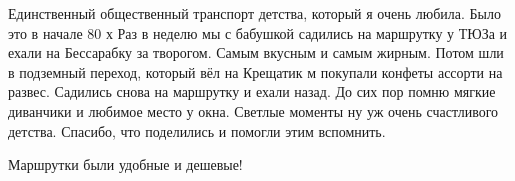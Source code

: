 \begin{itemize}
Единственный общественный транспорт детства, который я очень любила. Было это в
начале 80 х Раз в неделю мы с бабушкой садились на маршрутку у ТЮЗа и ехали на
Бессарабку за творогом. Самым вкусным и самым жирным. Потом шли в подземный
переход, который вёл на Крещатик м покупали конфеты ассорти на развес.
Садились снова на маршрутку и ехали назад. До сих пор помню мягкие диванчики и
любимое место у окна. Светлые моменты ну уж очень счастливого детства. Спасибо,
что поделились и помогли этим вспомнить.

Маршрутки были удобные и дешевые!



\end{itemize} %
